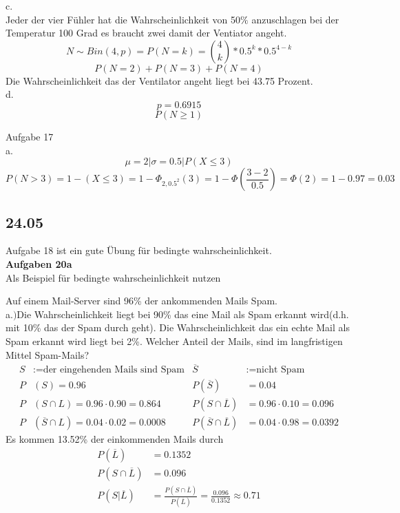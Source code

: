 c.\\

Jeder der vier Fühler hat die Wahrscheinlichkeit von 50$\%$ anzuschlagen bei der Temperatur 100 Grad es braucht zwei damit der Ventiator angeht.
\[N\sim Bin(4,p)=P(N=k)=\binom{4}{k}*0.5^k*0.5^{4-k}\]
\[P(N=2)+P(N=3)+P(N=4)\]
Die Wahrscheinlichkeit das der Ventilator angeht liegt bei 43.75 Prozent.\\

d.\\

\[p=0.6915\]\[ P(N\geq 1)\]

Aufgabe 17\\
a.\\
\[\mu =2 \vert \sigma =0.5 \vert P(X\leq 3)\]
\[P(N>3) = 1-(X\leq 3)= 1-\Phi _{2,0.5^2}(3)=1-\Phi (\frac{3-2}{0.5} )=\Phi (2)=1-0.97=0.03\]

\subsection{24.05}
Aufgabe 18 ist ein gute Übung für bedingte wahrscheinlichkeit.\\
\textbf{Aufgaben 20a}\\
Als Beispiel für bedingte wahrscheinlichkeit nutzen

Auf einem Mail-Server sind 96\% der ankommenden Mails Spam.\\
a.$)$Die Wahrscheinlichkeit liegt bei 90\% das eine Mail als Spam erkannt wird(d.h. mit 10\% das der Spam durch geht). Die Wahrscheinlichkeit das ein echte Mail als Spam erkannt wird liegt bei 2\%. Welcher Anteil der Mails, sind im langfristigen Mittel Spam-Mails?
\begin{align*}
    S&:= \textrm{der eingehenden Mails sind Spam} &\overline{S}&:= \textrm{nicht Spam}\\
    P&(S)=0.96 &P(\overline{S})&=0.04\\
    P&(S\cap L)= 0.96\cdot 0.90=0.864  &P(S\cap\overline{L})&=0.96\cdot0.10 = 0.096\\
    P&(\overline{S}\cap L)= 0.04\cdot 0.02 = 0.0008 &P(\overline{S}\cap\overline{L})&=0.04\cdot0.98 = 0.0392
\end{align*}
Es kommen 13.52\% der einkommenden Mails durch
\begin{align*}
    P(\overline{L})&= 0.1352\\
    P(S\cap\overline{L})&= 0.096\\
    P(S|\overline{L})&= \frac{P(S\cap \overline{L})}{P(\overline{L})} = \frac{0.096}{0.1352}\approx  0.71
\end{align*}


